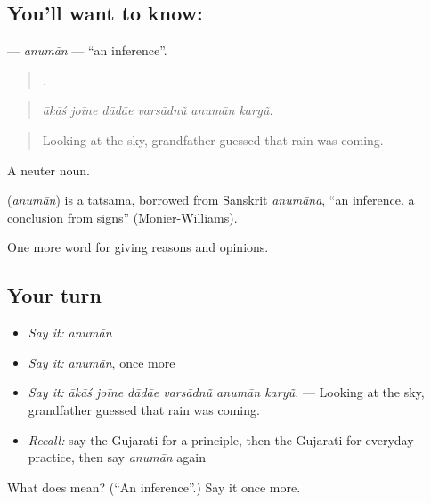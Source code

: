 \subsection*{You'll want to know: }
\textbf{} — \emph{anumān} — \textquotedblleft{}an inference\textquotedblright{}.

\begin{quote}
     .
\end{quote}

\begin{quote}
\emph{ākāś joīne dādāe varsādnũ anumān karyũ.}
\end{quote}

\begin{quote}
Looking at the sky, grandfather guessed that rain was coming.
\end{quote}

A neuter noun.

\begin{cousinweb}
\textbf{} (\emph{anumān}) is a tatsama, borrowed from Sanskrit \emph{anumāna}, \textquotedblleft{}an inference, a conclusion from signs\textquotedblright{} (Monier-Williams).
\end{cousinweb}

\begin{grammarlens}[title={What you've built}]
One more word for giving reasons and opinions.
\end{grammarlens}

\subsection*{Your turn}
\begin{itemize}
\raggedright
  \item \emph{Say it:} \emph{anumān}
  \item \emph{Say it:} \emph{anumān}, once more
  \item \emph{Say it:} \emph{ākāś joīne dādāe varsādnũ anumān karyũ.} — Looking at the sky, grandfather guessed that rain was coming.
  \item \emph{Recall:} say the Gujarati for a principle, then the Gujarati for everyday practice, then say \emph{anumān} again
\end{itemize}

\begin{tcolorbox}[breakable,colback=teal!4,colframe=teal!35!black,title={Before you move on}]
What does  mean? (\textquotedblleft{}An inference\textquotedblright{}.) Say it once more.
\end{tcolorbox}
